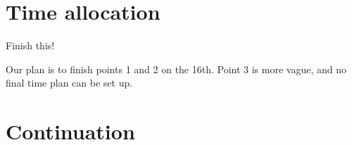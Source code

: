\documentclass[11pt,a4paper, 
english, swedish %
]{article}
\begin{document}
\section{Time allocation}
Finish this!

Our plan is to finish points 1 and 2 on the 16th. Point 3 is more
vague, and no final time plan can be set up. 

\section{Continuation}










\clearpage %
\appendix  %


\end{document}
